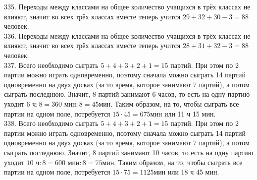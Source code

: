 335. Переходы между классами на общее количество учащихся в трёх классах не влияют, значит во всех трёх классах вместе теперь учится $29+32+30-3=88$ человек.\\
336. Переходы между классами на общее количество учащихся в трёх классах не влияют, значит во всех трёх классах вместе теперь учится $28+31+32-3=88$ человек.\\
337. Всего необходимо сыграть $5+4+3+2+1=15$ партий. При этом по 2 партии можно играть одновременно, поэтому сначала можно сыграть 14 партий одновременно на двух досках (за то время, которое занимают 7 партий), а потом сыграть последнюю. Значит, 8 партий занимают 6 часов, то есть на одну партию уходит $6\text{ ч}:8= 360\text{ мин}:8=45$мин. Таким образом, на то, чтобы сыграть все партии на одном поле, потребуется $15\cdot45=675$мин или 11 ч 15 мин.\\
338. Всего необходимо сыграть $5+4+3+2+1=15$ партий. При этом по 2 партии можно играть одновременно, поэтому сначала можно сыграть 14 партий одновременно на двух досках (за то время, которое занимают 7 партий), а потом сыграть последнюю. Значит, 8 партий занимают 10 часов, то есть на одну партию уходит $10\text{ ч}:8= 600\text{ мин}:8=75$мин. Таким образом, на то, чтобы сыграть все партии на одном поле, потребуется $15\cdot75=1125$мин или 18 ч 45 мин.
\newpage
